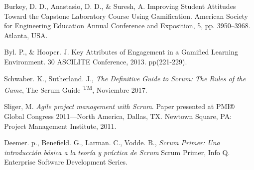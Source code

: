 \begin{thebibliography}{9}
        Burkey, D. D., Anastasio, D. D., \& Suresh, A.
        Improving Student Attitudes Toward the Capstone Laboratory Course Using Gamification.
        American Society for Engineering Education Annual Conference and Exposition, 5, pp. 3950–3968. Atlanta, USA.

        Byl. P., \& Hooper. J.
        Key Attributes of Engagement in a Gamified Learning Environment.
        30 ASCILITE Conference, 2013. pp(221-229).





        Schwaber. K., Sutherland. J.,
        {\it The Definitive Guide to Scrum: The Rules of the Game},
        The Scrum Guide \textsuperscript{TM}, Noviembre 2017.

        Sliger, M.
        {\it Agile project management with Scrum}.
        Paper presented at PMI® Global Congress 2011—North America, Dallas, TX. Newtown Square, PA: Project Management Institute, 2011.
        
        Deemer. p., Benefield. G., Larman. C., Vodde. B.,
        {\it Scrum Primer: Una introducción básica a la teoría y práctica de Scrum}
        Scrum Primer, Info Q. Enterprise Software Development Series.

       



\end{thebibliography}
